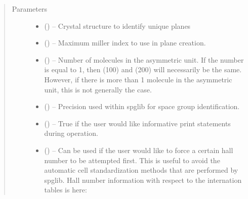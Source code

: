 \documentclass[letterpaper,10pt,english,openany,oneside]{sphinxmanual}
\begin{document}
\begin{fulllineitems}
\begin{sphinxVerbatim}[commandchars=\\\{\}]
    
\end{sphinxVerbatim}
\begin{quote}\begin{description}
\item[{Parameters}] \leavevmode\begin{itemize}
\item {} 
 () -- Crystal structure to identify unique planes

\item {} 
 () -- Maximum miller index to use in plane creation.

\item {} 
 () -- Number of molecules in the asymmetric unit. If the number is equal
to 1, then (100) and (200) will necessarily be the same. However,
if there is more than 1 molecule in the asymmetric unit, this
is not generally the case.

\item {} 
 () -- Precision used within spglib for space group identification.

\item {} 
 () -- True if the user would like informative print statements during
operation.

\item {} 
 () -- Can be used if the user would like to force a certain hall number to be
attempted first. This is useful to avoid the automatic cell
standardization methods that are performed by spglib.
Hall number information with respect to the internation tables is here:

\end{itemize}

\end{description}\end{quote}


\end{fulllineitems}
\end{document}
